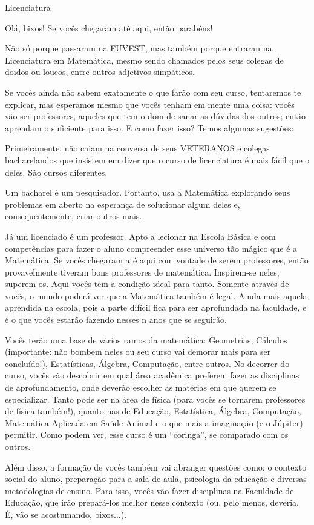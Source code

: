 \begin{subsecao}{Licenciatura}

Olá, bixos! Se vocês chegaram até aqui, então parabéns!

Não só porque passaram na FUVEST, mas também porque entraran na Licenciatura em
Matemática, mesmo sendo chamados pelos seus colegas de doidos ou loucos, entre
outros adjetivos simpáticos.

Se vocês ainda não sabem exatamente o que farão com seu curso, tentaremos te
explicar, mas esperamos mesmo que vocês tenham em mente uma coisa: vocês vão ser
professores, aqueles que tem o dom de sanar as dúvidas dos outros; então
aprendam o suficiente para isso. E como fazer isso? Temos algumas sugestões:

Primeiramente, não caiam na conversa de seus VETERANOS e colegas bacharelandos
que insistem em dizer que o curso de licenciatura é mais fácil que o deles. São
cursos diferentes.

Um bacharel é um pesquisador. Portanto, usa a Matemática explorando seus
problemas em aberto na esperança de solucionar algum deles e, consequentemente,
criar outros mais.

Já um licenciado é um professor. Apto a lecionar na Escola Básica e com
competências para fazer o aluno compreender esse universo tão mágico que é a
Matemática. Se vocês chegaram até aqui com vontade de serem professores, então
provavelmente tiveram bons professores de matemática. Inspirem-se neles,
superem-os.  Aqui vocês tem a condição ideal para tanto. Somente através de
vocês, o mundo poderá ver que a Matemática também é legal. Ainda mais aquela
aprendida na escola, pois a parte difícil fica para ser aprofundada na
faculdade, e é o que vocês estarão fazendo nesses n anos que se seguirão.

Vocês terão uma base de vários ramos da matemática: Geometrias, Cálculos
(importante: não bombem neles ou seu curso vai demorar mais para ser
concluído!), Estatísticas, Álgebra, Computação, entre outros. No decorrer do
curso, vocês vão descobrir em qual área acadêmica preferem fazer as disciplinas
de aprofundamento, onde deverão escolher as matérias em que querem se
especializar. Tanto pode ser na área de física (para vocês se tornarem
professores de física também!), quanto nas de Educação, Estatística, Álgebra,
Computação, Matemática Aplicada em Saúde Animal e o que mais a imaginação (e o
Júpiter) permitir. Como podem ver, esse curso é um ``coringa'', se comparado com
os outros.

Além disso, a formação de vocês também vai abranger questões como: o contexto
social do aluno, preparação para a sala de aula, psicologia da educação e
diversas metodologias de ensino. Para isso, vocês vão fazer disciplinas na
Faculdade de Educação, que irão prepará-los melhor nesse contexto (ou, pelo
menos, deveria. É, vão se acostumando, bixos...).


\end{subsecao}
